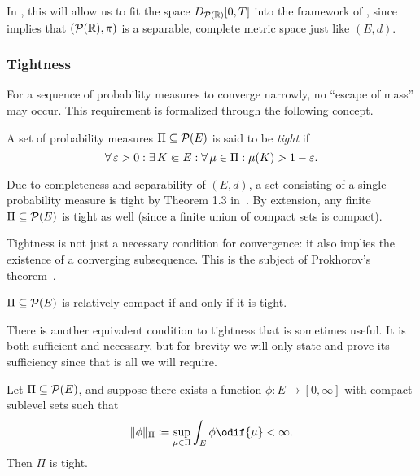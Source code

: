 In , this will allow us to fit the space \( D_{\mathcal{P}(\mathbb{R})}[0,T] \) into the framework of , since  implies that \( (\mathcal{P}(\mathbb{R}), \pi) \) is a separable, complete metric space just like \( (E, d) \).

\subsubsection{Tightness}

For a sequence of probability measures to converge narrowly, no \enquote{escape of mass} may occur.
This requirement is formalized through the following concept.

\begin{definition}
  A set of probability measures \( \Pi \subseteq \mathcal{P}(E) \) is said to be \textit{tight} if
  \begin{equation}
    \forall \eps > 0 : \exists K \Subset E : \forall \mu \in \Pi : \mu(K) > 1 - \eps.
  \end{equation}
\end{definition}

Due to completeness and separability of \((E,d)\), a set consisting of a single probability measure is tight by Theorem 1.3 in~\cite{billingsleyConvergenceProbabilityMeasures1999}.
By extension, any finite \(\Pi \subseteq \mathcal{P}(E)\) is tight as well (since a finite union of compact sets is compact).

Tightness is not just a necessary condition for convergence: it also implies the existence of a converging subsequence.
This is the subject of Prokhorov's theorem~\cite[57-65]{billingsleyConvergenceProbabilityMeasures1999}.

\begin{theorem}[Prokhorov]\label{thm:prokhorov}
  \( \Pi \subseteq \mathcal{P}(E) \) is relatively compact if and only if it is tight.
\end{theorem}

There is another equivalent condition to tightness that is sometimes useful.
It is both sufficient and necessary, but for brevity we will only state and prove its sufficiency since that is all we will require.

\begin{lemma}\label{lem:tightness-char-coercive-function}
  Let \( \Pi \subseteq \mathcal{P}(E) \), and suppose there exists a function \( \phi : E \to [0,\infty] \) with compact sublevel sets such that
  \begin{equation}
    \norm{\phi}_\Pi \coloneqq \sup_{\mu \in \Pi} \int_E \phi \odif{\mu} < \infty.
  \end{equation}
  Then \( \Pi \) is tight.
\end{lemma}

